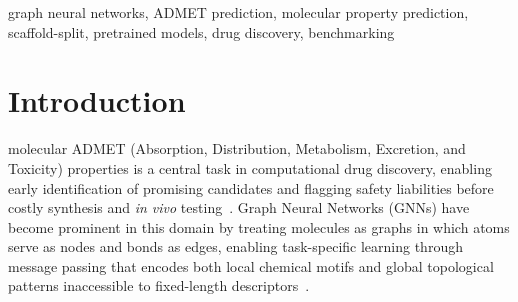 \documentclass[journal]{IEEEtran}
\begin{document}
\begin{IEEEkeywords}
graph neural networks, ADMET prediction, molecular property prediction, scaffold-split, pretrained models, drug discovery, benchmarking
\end{IEEEkeywords}


\section{Introduction}
\label{sec:intro}

 molecular ADMET (Absorption, Distribution, Metabolism, Excretion, and Toxicity) properties is a central task in computational drug discovery, enabling early identification of promising candidates and flagging safety liabilities before costly synthesis and \emph{in vivo} testing~\cite{zhang2025admet}. Graph Neural Networks (GNNs) have become prominent in this domain by treating molecules as graphs in which atoms serve as nodes and bonds as edges, enabling task-specific learning through message passing that encodes both local chemical motifs and global topological patterns inaccessible to fixed-length descriptors~\cite{gilmer2017neural, yang2019dmpnn, attentiveFP}.
\end{document}
